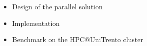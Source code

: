 \begin{itemize}
  \item Design of the parallel solution
  \item Implementation
  \item Benchmark on the HPC@UniTrento cluster
\end{itemize}
